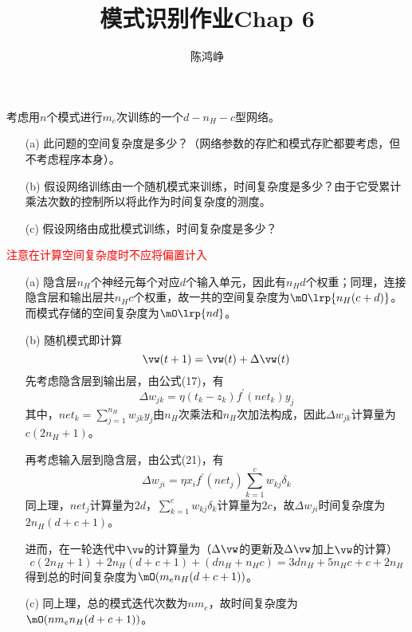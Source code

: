 \documentclass[reportComp]{thesis}
\title{模式识别作业Chap 6}
\author{陈鸿峥}
\begin{document}
\maketitle

\begin{question}[\textsection 6 Q3]
考虑用$n$个模式进行$m_e$次训练的一个$d-n_H-c$型网络。
\begin{itemize}
	\item [(a)] 此问题的空间复杂度是多少？（网络参数的存贮和模式存贮都要考虑，但不考虑程序本身）。
	\item [(b)] 假设网络训练由一个随机模式来训练，时间复杂度是多少？由于它受累计乘法次数的控制所以将此作为时间复杂度的测度。
	\item [(c)] 假设网络由成批模式训练，时间复杂度是多少？
\end{itemize}
\end{question}
\begin{answer}
\textcolor{red}{注意在计算空间复杂度时不应将偏置计入}
\begin{itemize}
	\item [(a)] 隐含层$n_H$个神经元每个对应$d$个输入单元，因此有$n_Hd$个权重；同理，连接隐含层和输出层共$n_Hc$个权重，故一共的空间复杂度为$\mO\lrp{n_H(c+d)}$。而模式存储的空间复杂度为$\mO\lrp{nd}$。

	\item [(b)] 随机模式即计算
	\[\vw(t+1)=\vw(t)+\Delta\vw(t)\]
	先考虑隐含层到输出层，由公式(17)，有
	\[\Delta w_{j k}=\eta\left(t_{k}-z_{k}\right) f^{\prime}\left(net_{k}\right) y_{j}\]
	其中，$net_k=\sum_{j=1}^{n_H}w_{jk}y_j$由$n_H$次乘法和$n_H$次加法构成，因此$\Delta w_{jk}$计算量为$c(2n_H+1)$。

	再考虑输入层到隐含层，由公式(21)，有
	\[\Delta w_{j i}=\eta x_{i} f^{\prime}\left(net_{j}\right) \sum_{k=1}^{c} w_{k j} \delta_{k}\]
	同上理，$net_j$计算量为$2d$，$\sum_{k=1}^{c} w_{k j} \delta_{k}$计算量为$2c$，故$\Delta w_{ji}$时间复杂度为$2n_H(d+c+1)$。

	进而，在一轮迭代中$\vw$的计算量为（$\Delta \vw$的更新及$\Delta\vw$加上$\vw$的计算）
	\[c(2n_H+1)+2n_H(d+c+1)+(dn_H+n_Hc)=3dn_H+5n_Hc+c+2n_H\]
	得到总的时间复杂度为$\mO(m_en_H(d+c+1))$。

	\item [(c)] 同上理，总的模式迭代次数为$nm_e$，故时间复杂度为$\mO(nm_en_H(d+c+1))$。
\end{itemize}
\end{answer}
\end{document}
